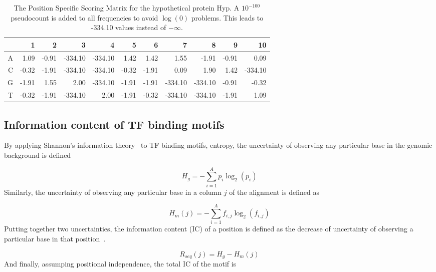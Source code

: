 \begin{table}
  \centering
  \caption[The Position Specific Scoring Matrix for the hypothetical
  protein.]{The Position Specific Scoring Matrix for the hypothetical protein
    Hyp. A $10^{-100}$ pseudocount is added to all frequencies to avoid
    $\log(0)$ problems. This leads to -334.10 values
    instead of $-\infty$.}
  \label{tab:pssm}
  \begin{tabular}{|r|r|r|r|r|r|r|r|r|r|r|}
\hline
  &     1 &   2 &    3 &    4 &    5 &    6 &    7 &    8 &    9 & 10\\
\hline
A &  1.09 & -0.91 & -334.10 & -334.10 &  1.42 &  1.42 &  1.55   & -1.91 & -0.91&   0.09\\
\hline
C & -0.32 & -1.91 & -334.10 & -334.10 & -0.32 & -1.91 &  0.09   & 1.90  & 1.42 & -334.10\\
\hline
G & -1.91 &  1.55 &  2.00   & -334.10 & -1.91 & -1.91 & -334.10 & -334.10 &  -0.91 & -0.32\\
\hline
T & -0.32 & -1.91 & -334.10 &  2.00   & -1.91 & -0.32 & -334.10 & -334.10 &  -1.91 &  1.09\\
\hline
  \end{tabular}
\end{table}

\subsection{Information content of TF binding motifs}

By applying Shannon’s information theory~\cite{shannon1948mathematical} to TF
binding motifs, entropy, the uncertainty of observing any particular base in
the genomic background is defined

\begin{equation}
  \label{eq:hg}
  H_g = -\displaystyle\sum_{i=1}^A p_i \log_2(p_i)
\end{equation}
Similarly, the uncertainty of observing any particular base in a column $j$ of
the alignment is defined as

\begin{equation}
  \label{eq:hm}
  H_m(j) = -\displaystyle\sum_{i=1}^A f_{i, j} \log_2(f_{i, j})
\end{equation}
Putting together two uncertainties, the information content (IC) of a position
is defined as the decrease of uncertainty of observing a particular base in
that position~\cite{schneider1986information}.

\begin{equation}
  \label{eq:rseq}
  R_{seq}(j) = H_g - H_m(j)
\end{equation}
And finally, assumping positional independence, the total IC of the motif is

